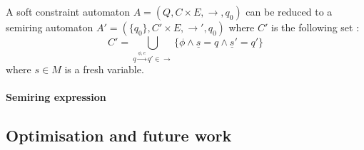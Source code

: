 \begin{theorem}
	A soft constraint automaton $A =(Q,C\times E, \rightarrow, q_0)$ can be reduced to a semiring automaton $A' = (\{q_0\}, C'\times E, \rightarrow', q_0)$ where $C'$ is the following set :
	$$C' = \bigcup\limits_{q\xrightarrow{\phi,e}q' \in \rightarrow} \{\phi \land \underline{s}=q \land \underline{s}'=q'\}$$
	where $s \in M$ is a fresh variable.
	
\end{theorem}

\paragraph{Semiring expression}
\subsection*{Optimisation and future work}